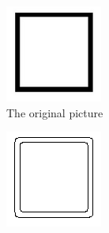 \documentclass[10pt,final,journal]{IEEEtran}
\begin{document}
\begin{figure}[h!]
    \centering
     \begin{subfigure}[b]{0.3\textwidth}
            \includegraphics[width=\textwidth]{square}
            \caption{The original picture}
            \label{fig:app_square}
    \end{subfigure}
    \begin{subfigure}[b]{0.3\textwidth}
            \includegraphics[width=\textwidth]{square_baseline}

\end{subfigure}
\end{figure}
\end{document}
